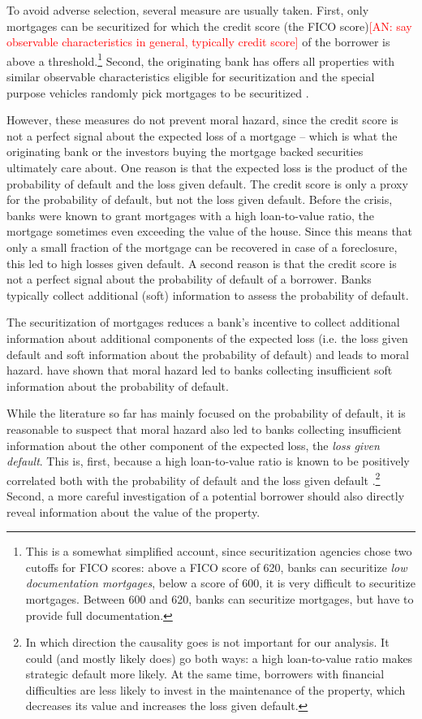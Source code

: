 \documentclass[11pt,twopage]{article}
\newcommand{\AN}[1]{\textcolor{red}{[AN: #1]}}
\begin{document}
To avoid adverse selection, several measure are usually taken. 
First, only mortgages can be securitized for which the
credit score (the FICO score)\AN{say observable characteristics in general,
typically credit score} of the borrower is above a
threshold.\footnote{This is a somewhat simplified account, since
  securitization agencies chose two cutoffs for FICO scores: above a
  FICO score of 620, banks can securitize \emph{low documentation
    mortgages}, below a score of 600, it is very difficult to
  securitize mortgages. Between 600 and 620, banks can securitize
  mortgages, but have to provide full documentation.}  Second, the
originating bank has offers all properties with similar observable
characteristics eligible for securitization and the special purpose
vehicles randomly
pick mortgages to be securitized \citep{keys2008did}.

However, these measures do not prevent moral
hazard, since the credit score is not a perfect signal about the
expected loss of a mortgage -- which is what the originating bank or the investors
buying the mortgage backed securities ultimately care about. One
reason is that the expected loss is the product of the probability of
default and the loss given default. The credit score is only a proxy
for the probability of default, but not the loss given default. Before
the crisis, banks were known to grant mortgages with a high
loan-to-value ratio, the mortgage sometimes even exceeding the value
of the house. Since this means that only a small fraction of the
mortgage can be recovered in case of a foreclosure, this led to high
losses given default. A second reason is that the credit score is not
a perfect signal about the probability of default of a borrower. Banks
typically collect additional (soft) information to assess the
probability of default.

The securitization of mortgages reduces a bank's incentive to collect
additional information about additional components of the expected
loss (i.e. the loss given default and soft information about the
probability of default) and leads to moral hazard. \cite{keys2008did}
have shown that moral hazard led to banks collecting insufficient soft
information about the probability of default.

While the literature so far has mainly focused on the probability of
default, it is reasonable to suspect that moral hazard also led to
banks collecting insufficient information about the other component of
the expected loss, the \emph{loss given default}. This is, first,
because a high loan-to-value ratio is known to be positively
correlated both with the probability of default and the loss given
default \citep[see][and the references
therein]{qi2009loss}.\footnote{In which direction the causality goes
  is not important for our analysis. It could (and mostly likely does)
  go both ways: a high loan-to-value ratio makes strategic default
  more likely. At the same time, borrowers with financial difficulties
  are less likely to invest in the maintenance of the property, which
  decreases its value and increases the loss given default.} Second, a
more careful investigation of a potential borrower should also
directly reveal information about the value of the property.
\end{document}
